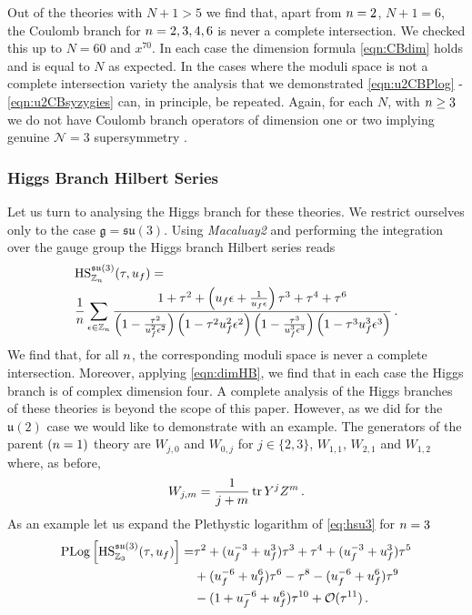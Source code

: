 \documentclass[main.tex]{subfiles}
\begin{document}
Out of the theories with $N+1>5$ we find that, apart from ${n}=2$, $N+1=6$, the Coulomb branch for ${n}=2,3,4,6$ is never a complete intersection. We checked this up to $N=60$ and $x^{70}$. In each case the dimension formula \eqref{eqn:CBdim} holds and is equal to $N$ as expected. In the cases where the moduli space is not a complete intersection variety the analysis that we demonstrated \eqref{eqn:u2CBPlog} - \eqref{eqn:u2CBsyzygies} can, in principle, be repeated. Again, for each $N$, with ${n}\geq3$ we do not have Coulomb branch operators of dimension one or two implying genuine $\mathcal{N}=3$ supersymmetry \cite{Aharony:2015oyb}. 

\subsubsection{Higgs Branch Hilbert Series}
Let us turn to analysing the Higgs branch for these theories. We restrict ourselves only to the case $\mathfrak{g}=\mathfrak{su}(3)$. Using \textit{Macaluay2} and performing the integration over the gauge group the Higgs branch Hilbert series reads
\begin{equation}\label{eq:hsu3}
\begin{aligned}
&\textrm{HS}_{\mathbb{Z}_{n}}^{\mathfrak{su}(3)}(\tau,u_f)= \\
&\frac{1}{{n}}\sum_{\epsilon \in \mathbb{Z}_{n}}\frac{1+\tau^2+ \left(u_f \epsilon +\frac{1}{u_f \epsilon }\right)\tau^3+\tau^4+\tau^6}{\left(1-\frac{\tau^2}{u_f^2 \epsilon ^2}\right)\left(1-\tau^2u_f^2\epsilon^2\right)\left(1-\frac{\tau^3}{u_f^3\epsilon^3}\right)\left(1-\tau^3u_f^3\epsilon^3\right) }\,.
\end{aligned}
\end{equation}
We find that, for all ${n}$, the corresponding moduli space is never a complete intersection. Moreover, applying \eqref{eqn:dimHB}, we find that in each case the Higgs branch is of complex dimension four.
A complete analysis of the Higgs branches of these theories is beyond the scope of this paper. However, as we did for the $\mathfrak{u}(2)$ case we would like to demonstrate with an example. The generators of the parent $({n}=1)$ theory are $W_{j,0}$ and $W_{0,j}$ for $j\in\{2,3\}$, $W_{1,1}$, $W_{2,1}$ and $W_{1,2}$ where, as before,
\begin{equation}
W_{j,m}=\frac{1}{j+m}\operatorname{tr} Y^jZ^m\,.
\end{equation}
As an example let us expand the Plethystic logarithm of \eqref{eq:hsu3} for ${n}=3$
\begin{equation}
\begin{aligned}
\operatorname{\mathrm{PLog}}\left[\textrm{HS}_{\mathbb{Z}_3}^{\mathfrak{su}(3)}(\tau,u_f)\right]= &\tau^2 + (u_f^{-3} + u_f^3) \tau^3 + \tau^4 + (u_f^{-3} + u_f^3) \tau^5   \\&+(u_f^{-6} + 
    u_f^6) \tau^6 - \tau^8- (u_f^{-6} + u_f^6) \tau^9\\
    &
    -(1+u_f^{-6}+u_f^6)\tau^{10}+\mathcal{O}(\tau^{11})\,.
\end{aligned}
\end{equation} 
\end{document}
